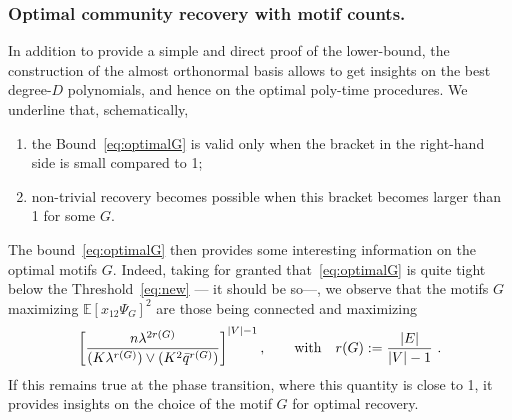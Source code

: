 \documentclass[final]{colt2026}
\newcommand{\1}{\mathbf{1}}
\begin{document}
\subsubsection{Optimal community recovery with motif counts.}\label{sec:intro-motif}
In addition to provide a simple and direct proof of the lower-bound, the construction of the almost orthonormal basis allows to get insights on the best degree-$D$ polynomials, and hence on the optimal poly-time procedures.
We underline that, schematically, 
\begin{enumerate}[wide, labelindent=0pt]\setlength{\itemsep}{0pt}
\item the Bound~\eqref{eq:optimalG} is valid only when the bracket in the right-hand side is small compared to 1;   
\item non-trivial recovery becomes possible when this bracket becomes larger than 1 for some $G$.
\end{enumerate}
The bound~\eqref{eq:optimalG} then provides some interesting information on the optimal motifs $G$. Indeed, taking for granted that~\eqref{eq:optimalG} is quite tight below the Threshold~\eqref{eq:new} --- it should be so---,  we observe that the motifs $G$ maximizing  $\mathbb{E}[x_{12}\Psi_G]^2$ are those being connected and maximizing
$$\left[\frac{n \lambda^{2r(G)}}{(K\lambda^{r(G)}) \vee (K^2 \bar q^{r(G)})}\right]^{|V|-1},\qquad\text{with}\quad r(G):={|E|\over |V|-1}\ .$$
If this remains true at the phase transition, where this quantity is close to 1, it provides insights on the choice of the motif $G$ for optimal recovery.
\end{document}
